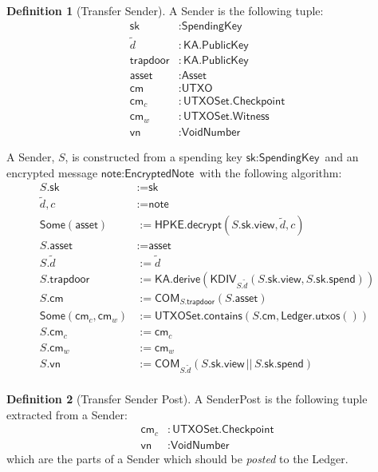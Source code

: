 \documentclass[a4paper]{article}
\theoremstyle{definition}
\newtheorem{definition}{Definition}[subsection]
\newcommand{\Asset}{{\textsf{Asset}}}
\newcommand{\COM}{{\textsf{COM}}}
\newcommand{\Checkpoint}{{\textsf{Checkpoint}}}
\newcommand{\EncryptedNote}{{\textsf{EncryptedNote}}}
\newcommand{\HPKE}{{\textsf{HPKE}}}
\newcommand{\KA}{{\textsf{KA}}}
\newcommand{\KDIV}{{\textsf{KDIV}}}
\newcommand{\Ledger}{{\textsf{Ledger}}}
\newcommand{\PublicKey}{{\textsf{PublicKey}}}
\newcommand{\SenderPost}{{\textsf{SenderPost}}}
\newcommand{\Sender}{{\textsf{Sender}}}
\newcommand{\Some}{{\textsf{Some}}}
\newcommand{\SpendingKey}{{\textsf{SpendingKey}}}
\newcommand{\Transfer}{{\textsf{Transfer}}}
\newcommand{\UTXOSet}{{\textsf{UTXOSet}}}
\newcommand{\UTXO}{{\textsf{UTXO}}}
\newcommand{\VoidNumber}{{\textsf{VoidNumber}}}
\newcommand{\Witness}{{\textsf{Witness}}}
\newcommand{\asset}{{\textsf{asset}}}
\newcommand{\cm}{{\textsf{cm}}}
\newcommand{\contains}{{\textsf{contains}}}
\newcommand{\decrypt}{{\textsf{decrypt}}}
\newcommand{\derive}{{\textsf{derive}}}
\newcommand{\note}{{\textsf{note}}}
\newcommand{\sk}{{\textsf{sk}}}
\newcommand{\spend}{{\textsf{spend}}}
\newcommand{\trapdoor}{{\textsf{trapdoor}}}
\newcommand{\utxos}{{\textsf{utxos}}}
\newcommand{\view}{{\textsf{view}}}
\newcommand{\vn}{{\textsf{vn}}}
\begin{document}
\begin{definition}[\Transfer{} Sender]
    A \Sender{} is the following tuple:
    \begin{align*}
        \sk       &: \SpendingKey \\
        \tilde{d} &: \KA.\PublicKey \\
        \trapdoor &: \KA.\PublicKey \\
        \asset    &: \Asset \\
        \cm       &: \UTXO \\
        \cm_c     &: \UTXOSet.\Checkpoint \\
        \cm_w   &: \UTXOSet.\Witness \\
        \vn       &: \VoidNumber
    \end{align*}

    A \Sender{}, $S$, is constructed from a spending key $\sk : \SpendingKey$ and an encrypted message $\note : \EncryptedNote$ with the following algorithm:
    \begin{align*}
        S.\sk                &:= \sk \\
        \tilde{d}, c         &:= \note \\
        \Some(\asset)        &:= \HPKE.\decrypt(S.\sk.\view, \tilde{d}, c) \\
        S.\asset             &:= \asset \\
        S.\tilde{d}          &:= \tilde{d} \\
        S.\trapdoor          &:= \KA.\derive(\KDIV_{S.\tilde{d}}(S.\sk.\view, S.\sk.\spend)) \\
        S.\cm                &:= \COM_{S.\trapdoor}(S.\asset) \\
        \Some(\cm_c, \cm_w)  &:= \UTXOSet.\contains(S.\cm, \Ledger.\utxos()) \\
        S.\cm_c              &:= \cm_c \\
        S.\cm_w              &:= \cm_w \\
        S.\vn                &:= \COM_{S.\tilde{d}}(S.\sk.\view \,||\, S.\sk.\spend) \\
    \end{align*}
\end{definition}

\begin{definition}[\Transfer{} Sender Post]
    A \SenderPost{} is the following tuple extracted from a \Sender{}:
    \begin{align*}
        \cm_c &: \UTXOSet.\Checkpoint \\
        \vn   &: \VoidNumber
    \end{align*}
    which are the parts of a \Sender{} which should be \emph{posted} to the \Ledger{}.
\end{definition}
\end{document}
